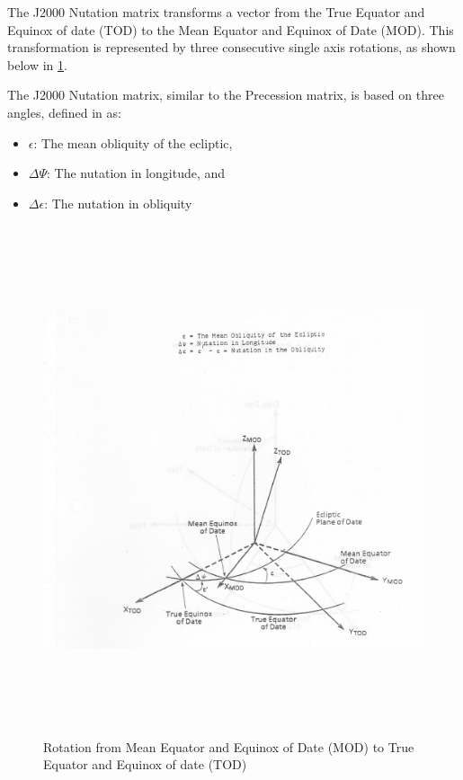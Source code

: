 The J2000 Nutation matrix transforms a vector from the True Equator and Equinox
of date (TOD) to the Mean Equator 
and Equinox of Date (MOD). This transformation is represented by
three consecutive single axis rotations, as shown below in 
\ref{fig:nut}.


The J2000 Nutation matrix, similar to the Precession matrix, is based on three
angles, defined in \cite{Bond1} as:

\begin{itemize}
\item $\epsilon$: The mean obliquity of the ecliptic,
\item $\Delta\Psi$: The nutation in longitude, and
\item $\Delta\epsilon$: The nutation in obliquity 
\end{itemize}

\begin{figure}[H]
\begin{center}
\includegraphics[height=150mm ,width = 150mm]{fig/fig2.jpg}
\caption{Rotation from Mean Equator and Equinox of Date (MOD) to 
True Equator and Equinox of date (TOD) \cite{Bond1}}
\label{fig:nut}
\end{center}
\end{figure}

